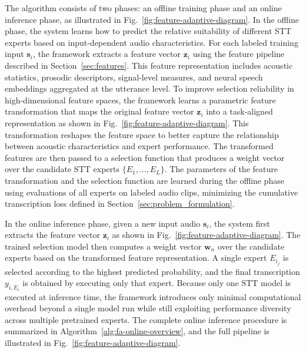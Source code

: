 \documentclass[journal]{IEEEtran}
\begin{document}
 The algorithm consists of two phases: an offline training phase and an
online inference phase, as illustrated in
Fig.~\ref{fig:feature-adaptive-diagram}. In the offline phase, the
system learns how to predict the relative suitability of different STT
experts based on input-dependent audio characteristics. For each
labeled training input $\mathbf{s}_i$, the framework extracts a feature vector
$\mathbf{z}_i$ using the feature pipeline described in
Section~\ref{sec:features}. This feature representation includes acoustic
statistics, prosodic descriptors, signal-level measures, and neural
speech embeddings aggregated at the utterance level. To improve selection reliability in high-dimensional feature spaces,
the framework learns a parametric feature transformation that maps the
original feature vector $\mathbf{z}_i$ into a task-aligned
representation as shown in Fig.~\ref{fig:feature-adaptive-diagram}. This transformation reshapes the feature space to
better capture the relationship between acoustic characteristics and
expert performance. The transformed features are then passed to a
selection function that produces a weight vector over the candidate
STT experts $\{E_1,\dots,E_L\}$. The parameters of the feature
transformation and the selection function are learned during the
offline phase using evaluations of all experts on labeled audio clips,
minimizing the cumulative transcription loss defined in
Section~\ref{sec:problem_formulation}.

In the online inference phase, given a new input audio $\mathbf{s}_i$, the
system first extracts the feature vector $\mathbf{z}_i$ as shown in Fig.~\ref{fig:feature-adaptive-diagram}. The trained
selection model then computes a weight vector $\mathbf{w}_n$ over the
candidate experts based on the transformed feature representation. A
single expert $E_{i_j}$ is selected according to the highest predicted
probability, and the final transcription $y_{i,E_i}$ is obtained by
executing only that expert. Because only one STT model is executed at
inference time, the framework introduces only minimal computational overhead beyond a single model run while still exploiting performance diversity across multiple pretrained experts. The complete online inference procedure is summarized in Algorithm~\ref{alg:fa-online-overview}, and the full pipeline is illustrated in Fig.~\ref{fig:feature-adaptive-diagram}. 
\end{document}
